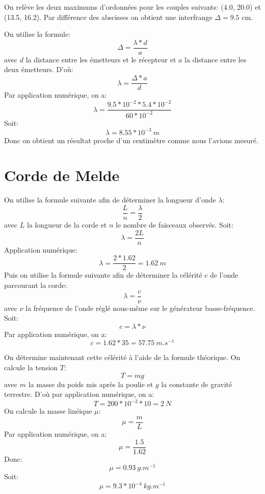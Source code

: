 \documentclass{scrartcl}
\begin{document}
		
		On relève les deux maximums d'ordonnées pour les couples suivants: (4.0, 20.0) et (13.5, 16.2). Par différence des abscisses on obtient une interfrange $\Delta=9.5$ cm.
		
		On utilise la formule:
		$$\Delta=\frac{\lambda*d}{a}$$ avec $d$ la distance entre les émetteurs et le récepteur et $a$ la distance entre les deux émetteurs.
		D'où:
		$$\lambda=\frac{\Delta*a}{d}$$
		Par application numérique, on a:
		$$\lambda=\frac{9.5*10^{-2}*5.4*10^{-2}}{60*10^{-2}}$$
		Soit:
		$$\lambda=8.55*10^{-3}\ m$$
		Donc on obtient un résultat proche d'un centimètre comme nous l'avions mesuré.

	\section{Corde de Melde}
	
		On utilise la formule suivante afin de déterminer la longueur d'onde $\lambda$:
		$$\frac{L}{n}=\frac{\lambda}{2}$$ avec $L$ la longueur de la corde et $n$ le nombre de faisceaux observés.
		Soit:
		$$\lambda=\frac{2L}{n}$$
		Application numérique:
		$$\lambda=\frac{2*1.62}{2}=1.62\ m$$
		Puis on utilise la formule suivante afin de déterminer la célérité $c$ de l'onde parcourant la corde:
		$$\lambda=\frac{c}{\nu}$$ avec $\nu$ la fréquence de l'onde réglé nous-même sur le générateur basse-fréquence.
		Soit:
		$$c=\lambda*\nu$$
		Par application numérique, on a:
		$$c=1.62*35=57.75\ m.s^{-1}$$
		
		On détermine maintenant cette célérité à l'aide de la formule théorique. On calcule la tension $T$:
		$$T=mg$$ avec $m$ la masse du poids mis après la poulie et $g$ la constante de gravité terrestre.
		D'où par application numérique, on a:
		$$T=200*10^{-2}*10=2\ N$$
		On calcule la masse linéique $\mu$:
		$$\mu=\frac{m}{L}$$
		Par application numérique, on a:
		$$\mu=\frac{1.5}{1.62}$$
		Donc:
		$$\mu=0.93\ g.m^{-1}$$
		Soit:
		$$\mu=9.3*10^{-4}\ kg.m^{-1}$$
		
\end{document}
